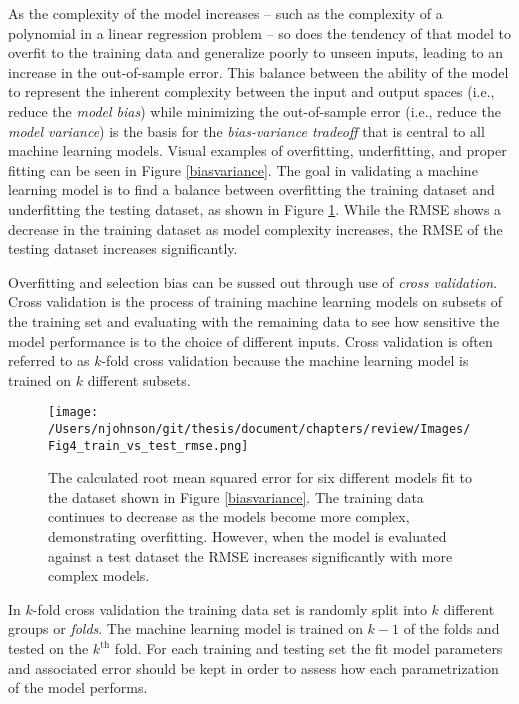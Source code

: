 As the complexity of the model increases -- such as the complexity of a polynomial in a linear regression problem --  so does the tendency of that model to overfit to the training data and generalize poorly to unseen inputs, leading to an increase in the out-of-sample error. This balance between the ability of the model to represent the inherent complexity between the input and output spaces (i.e., reduce the \emph{model bias}) while minimizing the out-of-sample error (i.e., reduce the \emph{model variance}) is the basis for the \emph{bias-variance tradeoff} that is central to all machine learning models. Visual examples of overfitting, underfitting, and proper fitting can be seen in Figure \ref{biasvariance}. The goal in validating a machine learning model is to find a balance between overfitting the training dataset and underfitting the testing dataset, as shown in Figure \ref{tvtrmse}. While the RMSE shows a decrease in the training dataset as model complexity increases, the RMSE of the testing dataset increases significantly.

Overfitting and selection bias can be sussed out through use of \textit{cross validation}. Cross validation is the process of training machine learning models on subsets of the training set and evaluating with the remaining data to see how sensitive the model performance is to the choice of different inputs. Cross validation is often referred to as $k$-fold cross validation because the machine learning model is trained on $k$ different subsets. 

\begin{figure}
	\texttt{[image: /Users/njohnson/git/thesis/document/chapters/review/Images/Fig4\_train\_vs\_test\_rmse.png]}
	\caption{The calculated root mean squared error for six different models fit to the dataset shown in Figure \ref{biasvariance}. The training data continues to decrease as the models become more complex, demonstrating overfitting. However, when the model is evaluated against a test dataset the RMSE increases significantly with more complex models.}
	\label{tvtrmse}
\end{figure}

In $k$-fold cross validation the training data set is randomly split into $k$ different groups or \textit{folds}. The machine learning model is trained on $k-1$ of the folds and tested on the $k^{\text{th}}$ fold. For each training and testing set the fit model parameters and associated error should be kept in order to assess how each parametrization of the model performs. 

